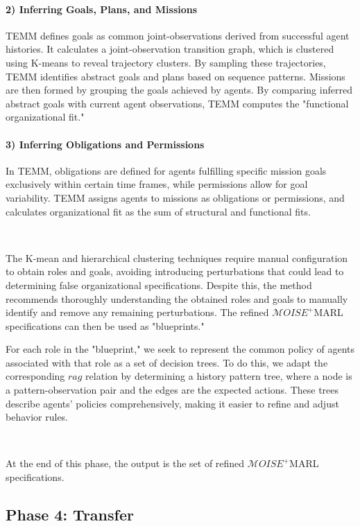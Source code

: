 \documentclass[pdflatex,sn-mathphys-num]{sn-jnl}%
\theoremstyle{thmstyleone}%
\theoremstyle{thmstyletwo}%
\theoremstyle{thmstylethree}%
\begin{document}
\paragraph{\textbf{2) Inferring Goals, Plans, and Missions}}

TEMM defines goals as common joint-observations derived from successful agent histories. It calculates a joint-observation transition graph, which is clustered using K-means to reveal trajectory clusters. By sampling these trajectories, TEMM identifies abstract goals and plans based on sequence patterns. Missions are then formed by grouping the goals achieved by agents. By comparing inferred abstract goals with current agent observations, TEMM computes the "functional organizational fit."

\paragraph{\textbf{3) Inferring Obligations and Permissions}}

In TEMM, obligations are defined for agents fulfilling specific mission goals exclusively within certain time frames, while permissions allow for goal variability. TEMM assigns agents to missions as obligations or permissions, and calculates organizational fit as the sum of structural and functional fits.


\

The K-mean and hierarchical clustering techniques require manual configuration to obtain roles and goals, avoiding introducing perturbations that could lead to determining false organizational specifications. Despite this, the method recommends thoroughly understanding the obtained roles and goals to manually identify and remove any remaining perturbations. The refined $\mathcal{M}OISE^+$MARL specifications can then be used as "blueprints."

For each role in the "blueprint," we seek to represent the common policy of agents associated with that role as a set of decision trees. To do this, we adapt the corresponding $rag$ relation by determining a history pattern tree, where a node is a pattern-observation pair and the edges are the expected actions. These trees describe agents' policies comprehensively, making it easier to refine and adjust behavior rules.

\

At the end of this phase, the output is the set of refined $\mathcal{M}OISE^+$MARL specifications.

\subsection{Phase 4: Transfer}
\end{document}
